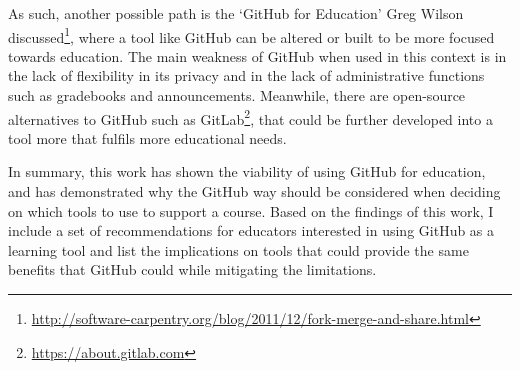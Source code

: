 As such, another possible path is the `GitHub for Education' Greg Wilson discussed\footnote{\url{http://software-carpentry.org/blog/2011/12/fork-merge-and-share.html}}, where a tool like GitHub can be altered or built to be more focused towards education. The main weakness of GitHub when used in this context is in the lack of flexibility in its privacy and in the lack of administrative functions such as gradebooks and announcements. Meanwhile, there are open-source alternatives to GitHub such as GitLab\footnote{\url{https://about.gitlab.com}}, that could be further developed into a tool more that fulfils more educational needs.

In summary, this work has shown the viability of using GitHub for education, and has demonstrated why the GitHub way should be considered when deciding on which tools to use to support a course. Based on the findings of this work, I include a set of recommendations for educators interested in using GitHub as a learning tool and list the implications on tools that could provide the same benefits that GitHub could while mitigating the limitations.


